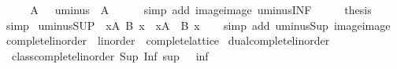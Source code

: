 \begin{isabellebody}
%
\isadelimproof
%
\endisadelimproof
%
\isatagproof
{}\isamarkupfalse%
\ {\isacharminus}{\kern0pt}\isanewline
\ \ \isamarkupfalse%
\ {\isachardoublequoteopen}{\isasymSqunion}A\ {\isacharequal}{\kern0pt}\ {\isacharminus}{\kern0pt}\ {\isasymSqinter}{\isacharparenleft}{\kern0pt}uminus\ {\isacharbackquote}{\kern0pt}\ A{\isacharparenright}{\kern0pt}{\isachardoublequoteclose}\isanewline
\ \ \ \ \isamarkupfalse%
\ {\isacharparenleft}{\kern0pt}simp\ add{\isacharcolon}{\kern0pt}\ image{\isacharunderscore}{\kern0pt}image\ uminus{\isacharunderscore}{\kern0pt}INF{\isacharparenright}{\kern0pt}\isanewline
\ \ \isamarkupfalse%
\ \isamarkupfalse%
\ {\isacharquery}{\kern0pt}thesis\ \isamarkupfalse%
\ simp\isanewline
{}\isamarkupfalse%
%
\endisatagproof
{\isafoldproof}%
%
\isadelimproof
\isanewline
%
\endisadelimproof
\isanewline
{}\isamarkupfalse%
\ uminus{\isacharunderscore}{\kern0pt}SUP{\isacharcolon}{\kern0pt}\ {\isachardoublequoteopen}{\isacharminus}{\kern0pt}\ {\isacharparenleft}{\kern0pt}{\isasymSqunion}x{\isasymin}A{\isachardot}{\kern0pt}\ B\ x{\isacharparenright}{\kern0pt}\ {\isacharequal}{\kern0pt}\ {\isacharparenleft}{\kern0pt}{\isasymSqinter}x{\isasymin}A{\isachardot}{\kern0pt}\ {\isacharminus}{\kern0pt}\ B\ x{\isacharparenright}{\kern0pt}{\isachardoublequoteclose}\isanewline
%
\isadelimproof
\ \ %
\endisadelimproof
%
\isatagproof
{}\isamarkupfalse%
\ {\isacharparenleft}{\kern0pt}simp\ add{\isacharcolon}{\kern0pt}\ uminus{\isacharunderscore}{\kern0pt}Sup\ image{\isacharunderscore}{\kern0pt}image{\isacharparenright}{\kern0pt}%
\endisatagproof
{\isafoldproof}%
%
\isadelimproof
\isanewline
%
\endisadelimproof
\isanewline
{}\isamarkupfalse%
\isanewline
\isanewline
{}\isamarkupfalse%
\ complete{\isacharunderscore}{\kern0pt}linorder\ {\isacharequal}{\kern0pt}\ linorder\ {\isacharplus}{\kern0pt}\ complete{\isacharunderscore}{\kern0pt}lattice\isanewline
{}\isanewline
\isanewline
{}\isamarkupfalse%
\ dual{\isacharunderscore}{\kern0pt}complete{\isacharunderscore}{\kern0pt}linorder{\isacharcolon}{\kern0pt}\isanewline
\ \ {\isachardoublequoteopen}class{\isachardot}{\kern0pt}complete{\isacharunderscore}{\kern0pt}linorder\ Sup\ Inf\ sup\ {\isacharparenleft}{\kern0pt}{\isasymge}{\isacharparenright}{\kern0pt}\ {\isacharparenleft}{\kern0pt}{\isachargreater}{\kern0pt}{\isacharparenright}{\kern0pt}\ inf\ {\isasymtop}\ {\isasymbottom}{\isachardoublequoteclose}\isanewline
%
\isadelimproof

\end{isabellebody}
